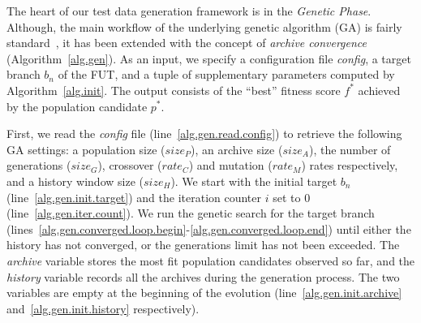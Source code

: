 The heart of our test data generation framework is in the \emph{Genetic Phase}. Although, the main workflow of the underlying genetic algorithm (GA) is fairly standard~\cite{poli2008field}, it has been extended with the concept of \emph{archive convergence} (Algorithm~\ref{alg.gen}). As an input, we specify a configuration file \emph{config}, a target branch $b_n$ of the FUT, and a tuple of supplementary parameters computed by Algorithm~\ref{alg.init}. The output consists of the ``best'' fitness score $f^*$ achieved by the population candidate $p^*$.

First, we read the \emph{config} file (line~\ref{alg.gen.read.config}) to retrieve the following GA settings: a population size  ($size_P$), an archive size ($size_A$), the number of generations ($size_G$), crossover ($rate_C$) and mutation ($rate_M$) rates respectively, and a history window size ($size_H$). We start with the initial target $b_n$ (line~\ref{alg.gen.init.target}) and the iteration counter $i$ set to 0 (line~\ref{alg.gen.iter.count}). We run the genetic search for the target branch (lines~\ref{alg.gen.converged.loop.begin}-\ref{alg.gen.converged.loop.end}) until either the history has not converged, or the generations limit has not been exceeded. The \emph{archive} variable stores the most fit population candidates observed so far, and the \emph{history} variable records all the archives during the generation process. The two variables are empty at the beginning of the evolution (line~\ref{alg.gen.init.archive} and~\ref{alg.gen.init.history} respectively).

